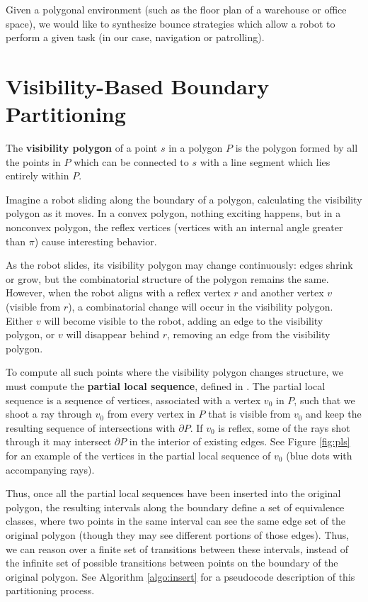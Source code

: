 \documentclass[]{styles/svproc}  %
\begin{document}
Given a polygonal environment (such as the floor plan of a warehouse or office
space), we would like to synthesize bounce strategies which allow a robot to
perform a given task (in our case, navigation or patrolling).

\section{Visibility-Based Boundary Partitioning} \label{sec:partition}

\begin{definition}
The \textbf{visibility polygon} of a point $s$ in a polygon $P$ is the polygon
formed by all the points in $P$ which can be connected to $s$ with a line
segment which lies entirely within $P$.
\end{definition}

Imagine a robot sliding along the boundary of a polygon, calculating 
the visibility polygon as it moves. In a convex polygon, nothing exciting 
happens, but in a nonconvex polygon, the reflex vertices (vertices with an
internal angle greater than $\pi$) cause interesting
behavior.

As the robot slides, its visibility polygon may change continuously: edges
shrink or grow, but the combinatorial structure of the polygon remains the same.
However, when the robot aligns with a reflex vertex $r$ and another vertex $v$ (visible
from $r$), a combinatorial change will occur in the visibility polygon. Either 
$v$ will become visible to the robot, adding an edge to the visibility 
polygon, or $v$ will disappear behind $r$, removing an edge from the visibility polygon.

To compute all such points where the visibility polygon changes structure, we
must compute the \textbf{partial local sequence}, defined in \cite{rourke_viz}.
The partial local sequence is a sequence of vertices, associated with a vertex
$v_0$ in $P$, such that we shoot a ray through $v_0$ from every vertex in $P$
that is visible from $v_0$ and keep the resulting sequence of intersections with
$\partial P$. If $v_0$ is reflex, some of the rays shot through it may intersect
$\partial P$ in the interior of existing edges. See Figure \ref{fig:pls} for an
example of the vertices in the partial local sequence of $v_0$ (blue dots with
accompanying rays).

Thus, once all the partial local sequences have been inserted into the original
polygon, the resulting intervals along the boundary define a set of equivalence
classes, where two points in the same interval can see the same edge set of the
original polygon (though they may see different portions of those edges). Thus,
we can reason over a finite set of transitions between these intervals, instead
of the infinite set of possible transitions between points on the boundary of
the original polygon. See Algorithm \ref{algo:insert} for a pseudocode
description of this partitioning process.
\end{document}

